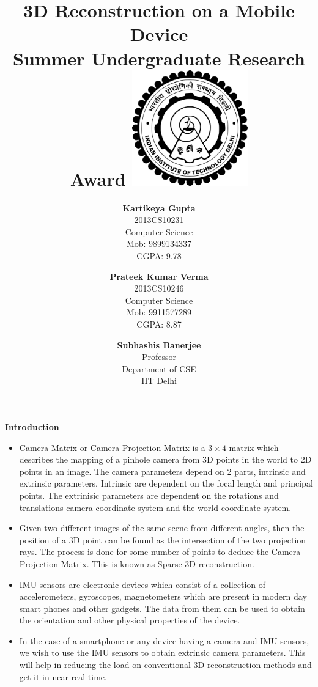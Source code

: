 \documentclass{article}
\title{\vspace*{\fill} \textbf{3D Reconstruction on a Mobile Device}
	  \\ {\large \textbf{Summer Undergraduate Research Award}}
	  \includegraphics[width=5cm]{logo.png}}
\author{
	\textbf{Kartikeya Gupta}\\ 
	2013CS10231\\
	Computer Science\\
	Mob: 9899134337\\
	CGPA: 9.78
	\and
	\textbf{Prateek Kumar Verma}\\ 
	2013CS10246\\
	Computer Science\\
	Mob: 9911577289\\
	CGPA: 8.87
}
\date{\textbf{Subhashis Banerjee} \\ Professor \\ Department of CSE \\ IIT Delhi \vspace*{\fill}}
\begin{document}
	\maketitle

	\newpage

	\textbf{\Large Introduction \\}
		\begin{itemize}
		
			\item 
				Camera Matrix or Camera Projection Matrix is a $3 \times 4$ matrix which describes the mapping of a pinhole camera from 3D points in the world to 2D points in an image. The camera parameters depend on 2 parts, intrinsic and extrinsic parameters. Intrinsic are dependent on the focal length and principal points. The extrinisic parameters are dependent on the rotations and translations camera coordinate system and the world coordinate system.
			
			\item 
				Given two different images of the same scene from different angles, then the position of a 3D point can be found as the intersection of the two projection rays. The process is done for some number of points to deduce the Camera Projection Matrix. This is known as Sparse 3D reconstruction.

			\item
				IMU sensors are electronic devices which consist of a collection of accelerometers, gyroscopes, magnetometers which are present in modern day smart phones and other gadgets. The data from them can be used to obtain the orientation and other physical properties of the device.

			\item 
				In the case of a smartphone or any device having a camera and IMU sensors, we wish to use  the IMU sensors to obtain extrinsic camera parameters. This will help in reducing the load on conventional 3D reconstruction methods and get it in near real time.
		\end{itemize}
\end{document}
